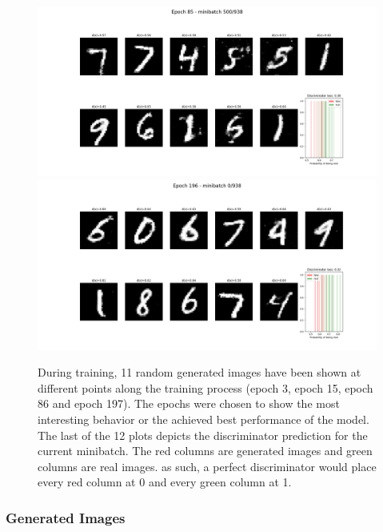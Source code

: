 \documentclass[12pt, fleqn, titlepage]{article}
\newcommand{\1}[1]{\mathds{1}\left[#1\right]}
\begin{document}
\begin{figure}[H]
	\includegraphics[width=\linewidth]{imgs/MNIST_GAN_mse_result_epoch_84_minibatch_500}
	\hfill
	\includegraphics[width=\linewidth]{imgs/MNIST_GAN_mse_result_epoch_195_minibatch_0}
	\caption{During training, 11 random generated images have been shown at different points along the training process (epoch 3, epoch 15, epoch 86 and epoch 197). The epochs were chosen to show the most interesting behavior or the achieved best performance of the model. The last of the 12 plots depicts the discriminator prediction for the current minibatch. The red columns are generated images and green columns are real images. as such, a perfect discriminator would place every red column at 0 and every green column at 1.}
		\label{fig:training_progress_mse}
\end{figure}

\subsubsection{Generated Images}
\end{document}
